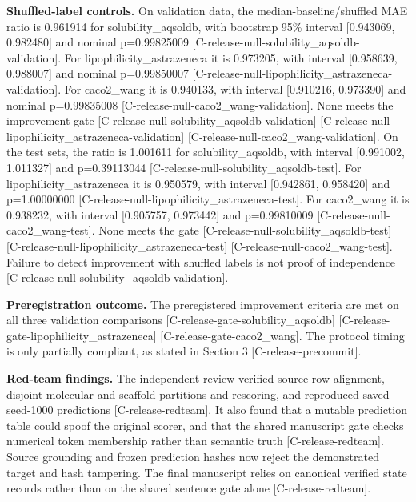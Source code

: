 \documentclass[10pt,twocolumn]{article}
\begin{document}
\textbf{Shuffled-label controls.} On validation data, the median-baseline/shuffled MAE ratio is 0.961914 for solubility_aqsoldb, with bootstrap 95\% interval [0.943069, 0.982480] and nominal p=0.99825009 {\scriptsize[C-release-null-solubility\_aqsoldb-validation]}. For lipophilicity_astrazeneca it is 0.973205, with interval [0.958639, 0.988007] and nominal p=0.99850007 {\scriptsize[C-release-null-lipophilicity\_astrazeneca-validation]}. For caco2_wang it is 0.940133, with interval [0.910216, 0.973390] and nominal p=0.99835008 {\scriptsize[C-release-null-caco2\_wang-validation]}. None meets the improvement gate {\scriptsize[C-release-null-solubility\_aqsoldb-validation]} {\scriptsize[C-release-null-lipophilicity\_astrazeneca-validation]} {\scriptsize[C-release-null-caco2\_wang-validation]}. On the test sets, the ratio is 1.001611 for solubility_aqsoldb, with interval [0.991002, 1.011327] and p=0.39113044 {\scriptsize[C-release-null-solubility\_aqsoldb-test]}. For lipophilicity_astrazeneca it is 0.950579, with interval [0.942861, 0.958420] and p=1.00000000 {\scriptsize[C-release-null-lipophilicity\_astrazeneca-test]}. For caco2_wang it is 0.938232, with interval [0.905757, 0.973442] and p=0.99810009 {\scriptsize[C-release-null-caco2\_wang-test]}. None meets the gate {\scriptsize[C-release-null-solubility\_aqsoldb-test]} {\scriptsize[C-release-null-lipophilicity\_astrazeneca-test]} {\scriptsize[C-release-null-caco2\_wang-test]}. Failure to detect improvement with shuffled labels is not proof of independence {\scriptsize[C-release-null-solubility\_aqsoldb-validation]}.

\textbf{Preregistration outcome.} The preregistered improvement criteria are met on all three validation comparisons {\scriptsize[C-release-gate-solubility\_aqsoldb]} {\scriptsize[C-release-gate-lipophilicity\_astrazeneca]} {\scriptsize[C-release-gate-caco2\_wang]}. The protocol timing is only partially compliant, as stated in Section 3 {\scriptsize[C-release-precommit]}.

\textbf{Red-team findings.} The independent review verified source-row alignment, disjoint molecular and scaffold partitions and rescoring, and reproduced saved seed-1000 predictions {\scriptsize[C-release-redteam]}. It also found that a mutable prediction table could spoof the original scorer, and that the shared manuscript gate checks numerical token membership rather than semantic truth {\scriptsize[C-release-redteam]}. Source grounding and frozen prediction hashes now reject the demonstrated target and hash tampering. The final manuscript relies on canonical verified state records rather than on the shared sentence gate alone {\scriptsize[C-release-redteam]}.
\end{document}
